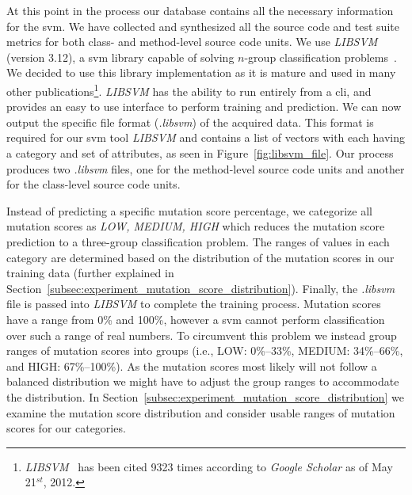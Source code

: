 At this point in the process our database contains all the necessary information for the \gls{svm}. We have collected and synthesized all the source code and test suite metrics for both class- and method-level source code units. We use \emph{LIBSVM} (version 3.12), a \gls{svm} library capable of solving $n$-group classification problems~\cite{CL11}. We decided to use this library implementation as it is mature and used in many other publications\footnote{\emph{LIBSVM}~\cite{CL11} has been cited 9323 times according to \emph{Google Scholar} as of May 21$^{st}$, 2012.}. \emph{LIBSVM} has the ability to run entirely from a \gls{cli}, and provides an easy to use interface to perform training and prediction. We can now output the specific file format (\emph{.libsvm}) of the acquired data. This format is required for our \gls{svm} tool \emph{LIBSVM} and contains a list of vectors with each having a category and set of attributes, as seen in Figure~\ref{fig:libsvm_file}. Our process produces two \emph{.libsvm} files, one for the method-level source code units and another for the class-level source code units.

Instead of predicting a specific mutation score percentage, we categorize all mutation scores as \textit{LOW, MEDIUM, HIGH} which reduces the mutation score prediction to a three-group classification problem. The ranges of values in each category are determined based on the distribution of the mutation scores in our training data (further explained in Section~\ref{subsec:experiment_mutation_score_distribution}). Finally, the \emph{.libsvm} file is passed into \emph{LIBSVM} to complete the training process. Mutation scores have a range from 0\% and 100\%, however a \gls{svm} cannot perform classification over such a range of real numbers. To circumvent this problem we instead group ranges of mutation scores into groups (i.e., LOW: 0\%--33\%, MEDIUM: 34\%--66\%, and HIGH: 67\%--100\%). As the mutation scores most likely will not follow a balanced distribution we might have to adjust the group ranges to accommodate the distribution. In Section~\ref{subsec:experiment_mutation_score_distribution} we examine the mutation score distribution and consider usable ranges of mutation scores for our categories.


